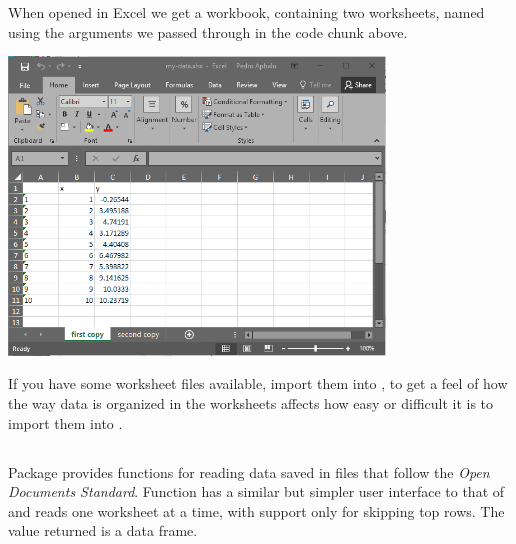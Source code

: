 \documentclass[krantz2]{krantz}\usepackage{knitr}%
\begin{document}
When opened in Excel we get a workbook, containing two worksheets, named using the arguments we passed through  in the code chunk above.
\begin{center}
\includegraphics[width=0.75\textwidth]{figures/my-data-xlsx.png}
\end{center}

\begin{playground}
If you have some worksheet files available, import them into \Rlang, to get a feel of how the way data is organized in the worksheets affects how easy or difficult it is to import them into \Rlang.
\end{playground}

\subsection['readODS']{}

Package  provides functions for reading data saved in files that follow the \emph{Open Documents Standard}. Function  has a similar but simpler user interface to that of  and reads one worksheet at a time, with support only for skipping top rows. The value returned is a data frame.
\end{document}
